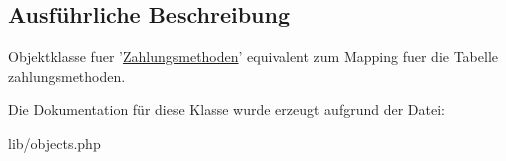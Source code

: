 \subsection{\-Ausführliche \-Beschreibung}
\-Objektklasse fuer '\hyperlink{classZahlungsmethoden}{\-Zahlungsmethoden}' equivalent zum \-Mapping fuer die \-Tabelle zahlungsmethoden. 

\-Die \-Dokumentation für diese \-Klasse wurde erzeugt aufgrund der \-Datei\-:\begin{DoxyCompactItemize}
\item 
lib/objects.\-php\end{DoxyCompactItemize}
